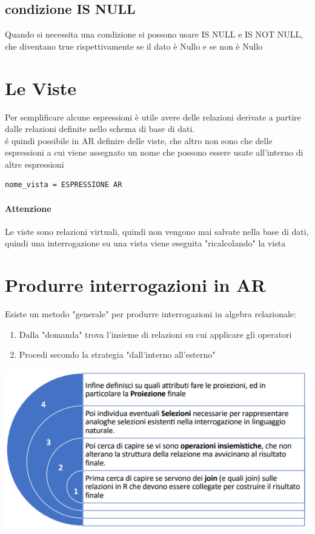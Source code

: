 \documentclass[12pt, a4paper, openany]{book}
\begin{document}
\subsection*{condizione IS NULL}
Quando si necessita una condizione si possono usare IS NULL e IS NOT NULL, che diventano true rispettivamente se il dato è Nullo e se non è Nullo

\section{Le Viste}
Per semplificare alcune espressioni è utile avere delle relazioni derivate a partire dalle relazioni definite nello schema di base di dati.
\\é quindi possibile in AR definire delle viste, che altro non sono che delle espressioni a cui viene assegnato un nome che possono essere usate all'interno di altre espressioni

\begin{lstlisting}
nome_vista = ESPRESSIONE AR
\end{lstlisting}

\paragraph{Attenzione} Le viste sono relazioni virtuali, quindi non vengono mai salvate nella base di dati, quindi una interrogazione su una vista viene eseguita "ricalcolando" la vista


\section{Produrre interrogazioni in AR}
Esiste un metodo "generale" per produrre interrogazioni in algebra relazionale:
\begin{enumerate}
    \item Dalla "domanda" trova l'insieme di relazioni su cui applicare gli operatori
    \item Procedi secondo la strategia "dall'interno all'esterno"
\end{enumerate}
\includegraphics{AR1.png}
\end{document}
